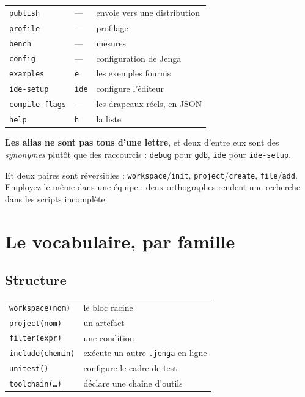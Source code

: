 \begin{center}
\begin{tabular}{@{}llp{6.6cm}@{}}
\texttt{publish} & --- & envoie vers une distribution \\
\texttt{profile} & --- & profilage \\
\texttt{bench} & --- & mesures \\
\texttt{config} & --- & configuration de Jenga \\
\texttt{examples} & \texttt{e} & les exemples fournis \\
\texttt{ide-setup} & \texttt{ide} & configure l'éditeur \\
\texttt{compile-flags} & --- & les drapeaux réels, en JSON \\
\texttt{help} & \texttt{h} & la liste \\
\bottomrule
\end{tabular}
\end{center}

\begin{nkretenir}
\textbf{Les alias ne sont pas tous d'une lettre}, et deux d'entre eux sont des
\emph{synonymes} plutôt que des raccourcis : \texttt{debug} pour \texttt{gdb},
\texttt{ide} pour \texttt{ide-setup}.

Et deux paires sont réversibles : \texttt{workspace}/\texttt{init},
\texttt{project}/\texttt{create}, \texttt{file}/\texttt{add}. Employez le même
dans une équipe : deux orthographes rendent une recherche dans les scripts
incomplète.
\end{nkretenir}

\section{Le vocabulaire, par famille}

\subsection*{Structure}

\begin{center}
\begin{tabular}{@{}ll@{}}
\toprule
\texttt{workspace(nom)} & le bloc racine \\
\texttt{project(nom)} & un artefact \\
\texttt{filter(expr)} & une condition \\
\texttt{include(chemin)} & exécute un autre \texttt{.jenga} en ligne \\
\texttt{unitest()} & configure le cadre de test \\
\texttt{toolchain(\dots)} & déclare une chaîne d'outils \\
\bottomrule
\end{tabular}
\end{center}

